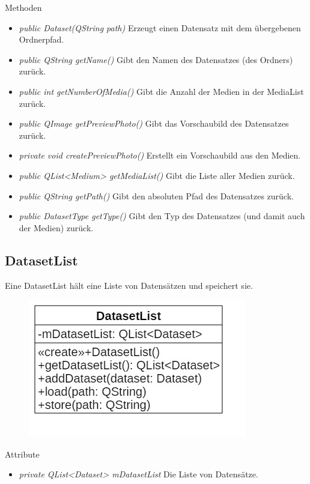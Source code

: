 Methoden
\begin{itemize}
\item \textit{public Dataset(QString path)} Erzeugt einen Datensatz mit dem übergebenen Ordnerpfad.
\item \textit{public QString getName()} Gibt den Namen des Datensatzes (des Ordners) zurück.
\item \textit{public int getNumberOfMedia()} Gibt die Anzahl der Medien in der MediaList zurück.
\item \textit{public QImage getPreviewPhoto()} Gibt das Vorschaubild des Datensatzes zurück.
\item \textit{private void createPreviewPhoto()} Erstellt ein Vorschaubild aus den Medien.
\item \textit{public QList<Medium> getMediaList()} Gibt die Liste aller Medien zurück.
\item \textit{public QString getPath()} Gibt den absoluten Pfad des Datensatzes zurück.
\item \textit{public DatasetType getType()} Gibt den Typ des Datensatzes (und damit auch der Medien) zurück.
\end{itemize}

\subsection*{DatasetList}
Eine DatasetList hält eine Liste von Datensätzen und speichert sie.

\begin{figure}[H]
\centering
\includegraphics[scale=0.5]{img/Klassendiagramm/Klassen/Model/DatasetList}
\label{fig:datasetList}
\end{figure}

Attribute
\begin{itemize}
\item\textit{private QList<Dataset> mDatasetList} Die Liste von Datensätze.
\end{itemize}

